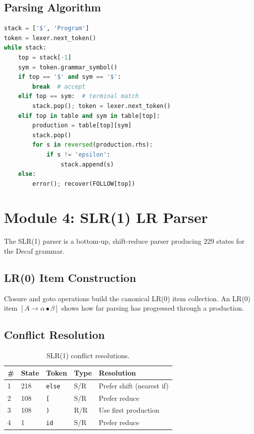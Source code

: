 \documentclass[12pt,a4paper]{article}
\begin{document}
\subsection{Parsing Algorithm}

\begin{lstlisting}[style=code,language=Python]
stack = ['$', 'Program']
token = lexer.next_token()
while stack:
    top = stack[-1]
    sym = token.grammar_symbol()
    if top == '$' and sym == '$':
        break  # accept
    elif top == sym:  # terminal match
        stack.pop(); token = lexer.next_token()
    elif top in table and sym in table[top]:
        production = table[top][sym]
        stack.pop()
        for s in reversed(production.rhs):
            if s != 'epsilon':
                stack.append(s)
    else:
        error(); recover(FOLLOW[top])
\end{lstlisting}

\section{Module 4: SLR(1) LR Parser}

The SLR(1) parser is a bottom-up, shift-reduce parser producing 229 states
for the Decaf grammar.

\subsection{LR(0) Item Construction}

Closure and goto operations build the canonical LR(0) item collection. An LR(0)
item $[A \to \alpha \bullet \beta]$ shows how far parsing has progressed through
a production.

\subsection{Conflict Resolution}

\begin{table}[h]
\centering
\begin{tabular}{lllll}
\toprule
\textbf{\#} & \textbf{State} & \textbf{Token} & \textbf{Type} & \textbf{Resolution} \\
\midrule
1 & 218 & \texttt{else} & S/R & Prefer shift (nearest if) \\
2 & 108 & \texttt{[}   & S/R & Prefer reduce \\
3 & 108 & \texttt{)}   & R/R & Use first production \\
4 & 1   & \texttt{id}  & S/R & Prefer reduce \\
\bottomrule
\end{tabular}
\caption{SLR(1) conflict resolutions.}
\end{table}
\end{document}
